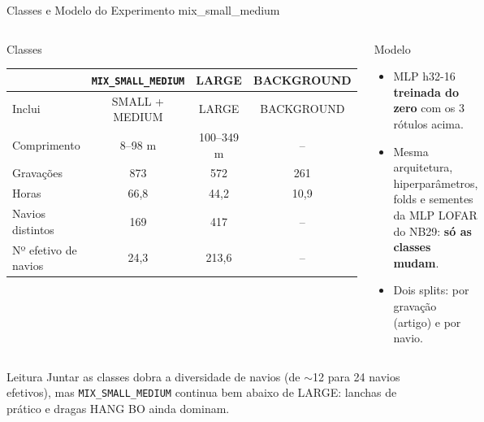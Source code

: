 \documentclass[aspectratio=169]{beamer}
\newcommand{\camd}[1]{\cellcolor{yellow!35}#1}
\newcommand{\mix}{\texttt{MIX\_SMALL\_MEDIUM}}
\begin{document}
\begin{frame}{Classes e Modelo do Experimento mix\_small\_medium}
    \footnotesize
    \begin{columns}[t]
        \begin{block}{\small Classes}
            \tiny
            \centering
            \setlength{\tabcolsep}{3pt}
            \begin{tabular}{lccc}
            \toprule
             & \mix & LARGE & BACKGROUND \\
            \midrule
            Inclui & SMALL + MEDIUM & LARGE & BACKGROUND \\
            Comprimento & 8--98 m & 100--349 m & -- \\
            Gravações & 873 & 572 & 261 \\
            Horas & 66,8 & 44,2 & 10,9 \\
            Navios distintos & 169 & 417 & -- \\
            Nº efetivo de navios & \camd{24,3} & 213,6 & -- \\
            \bottomrule
            \end{tabular}
        \end{block}
        \begin{block}{\small Modelo}
            \scriptsize
            \begin{itemize}
                \setlength{\itemsep}{1pt}
                \item MLP h32-16 \textbf{treinada do zero} com os 3 rótulos acima.
                \item Mesma arquitetura, hiperparâmetros, folds e sementes da MLP LOFAR do NB29: \textbf{só as classes mudam}.
                \item Dois splits: por gravação (artigo) e por navio.
            \end{itemize}
        \end{block}
    \end{columns}
    \vspace{0.1cm}
    \begin{alertblock}{Leitura}
        \scriptsize
        Juntar as classes dobra a diversidade de navios (de $\sim$12 para 24 navios efetivos), mas \mix{} continua bem abaixo de LARGE: lanchas de prático e dragas HANG BO ainda dominam.
    \end{alertblock}
\end{frame}

\end{document}
